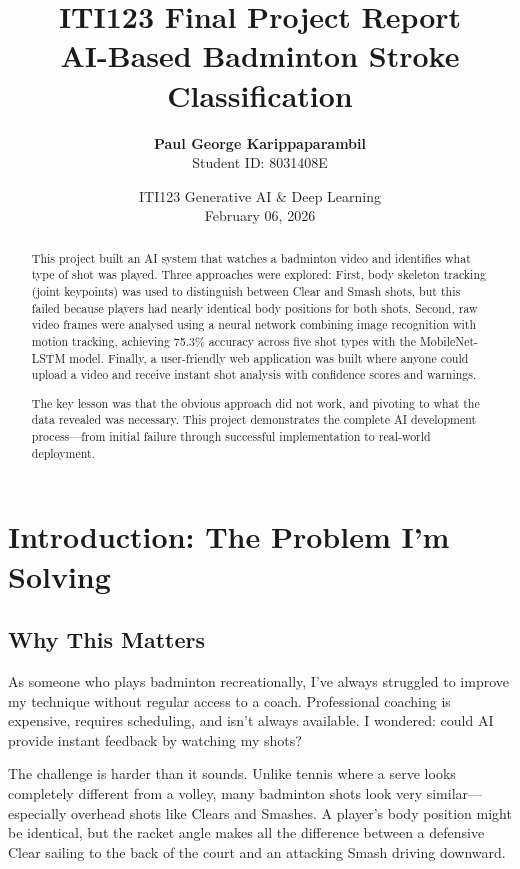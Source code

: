 \documentclass[11pt,a4paper]{article}
\title{\textbf{ITI123 Final Project Report}\\\vspace{0.3cm}AI-Based Badminton Stroke Classification}
\author{\textbf{Paul George Karippaparambil}\\Student ID: 8031408E}
\date{ITI123 Generative AI \& Deep Learning\\February 06, 2026}
\begin{document}
\maketitle
\thispagestyle{empty}

\begin{abstract}
This project built an AI system that watches a badminton video and identifies what type of shot was played. Three approaches were explored: First, body skeleton tracking (joint keypoints) was used to distinguish between Clear and Smash shots, but this failed because players had nearly identical body positions for both shots. Second, raw video frames were analysed using a neural network combining image recognition with motion tracking, achieving 75.3\% accuracy across five shot types with the MobileNet-LSTM model. Finally, a user-friendly web application was built where anyone could upload a video and receive instant shot analysis with confidence scores and warnings.

The key lesson was that the obvious approach did not work, and pivoting to what the data revealed was necessary. This project demonstrates the complete AI development process---from initial failure through successful implementation to real-world deployment.
\end{abstract}

\newpage
\tableofcontents
\newpage

\section{Introduction: The Problem I'm Solving}

\subsection{Why This Matters}

As someone who plays badminton recreationally, I've always struggled to improve my technique without regular access to a coach. Professional coaching is expensive, requires scheduling, and isn't always available. I wondered: could AI provide instant feedback by watching my shots?

The challenge is harder than it sounds. Unlike tennis where a serve looks completely different from a volley, many badminton shots look very similar---especially overhead shots like Clears and Smashes. A player's body position might be identical, but the racket angle makes all the difference between a defensive Clear sailing to the back of the court and an attacking Smash driving downward.
\end{document}

